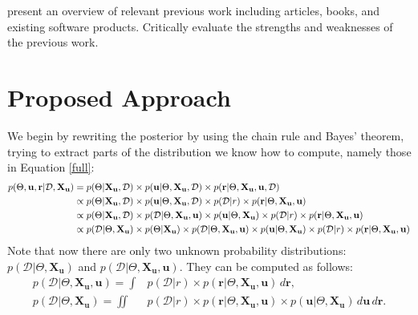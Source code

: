 \documentclass{mprop}
\theoremstyle{definition}
\begin{document}
present an overview of relevant previous work including articles, books, and
existing software products. Critically evaluate the strengths and weaknesses of
the previous work.

\section{Proposed Approach}


We begin by rewriting the posterior by using the chain rule and Bayes' theorem,
trying to extract parts of the distribution we know how to compute, namely those
in Equation \ref{full}:
\[
  \begin{split}
    p(\Theta, \mathbf{u}, \mathbf{r} | \mathcal{D}, \mathbf{X_u}) &= p(\Theta | \mathbf{X_u}, \mathcal{D}) \times p(\mathbf{u} |
    \Theta, \mathbf{X_u}, \mathcal{D}) \times p(\mathbf{r} | \Theta,
    \mathbf{X_u}, \mathbf{u}, \mathcal{D}) \\
    &\propto p(\Theta | \mathbf{X_u}, \mathcal{D}) \times p(\mathbf{u} | \Theta,
    \mathbf{X_u}, \mathcal{D}) \times p(\mathcal{D} | r) \times p(\mathbf{r} |
    \Theta, \mathbf{X_u}, \mathbf{u}) \\
    &\propto p(\Theta | \mathbf{X_u}, \mathcal{D}) \times p(\mathcal{D} |
    \Theta, \mathbf{X_u}, \mathbf{u}) \times p(\mathbf{u} | \Theta,
    \mathbf{X_u}) \times p(\mathcal{D} | r) \times p(\mathbf{r} | \Theta,
    \mathbf{X_u}, \mathbf{u}) \\
    &\propto p(\mathcal{D} | \Theta, \mathbf{X_u}) \times p(\Theta |
    \mathbf{X_u}) \times p(\mathcal{D} | \Theta, \mathbf{X_u}, \mathbf{u})
    \times p(\mathbf{u} | \Theta, \mathbf{X_u}) \times p(\mathcal{D} | r) \times
    p(\mathbf{r} | \Theta, \mathbf{X_u}, \mathbf{u})
  \end{split}
\]
Note that now there are only two unknown probability distributions:
$p(\mathcal{D} | \Theta, \mathbf{X_u})$ and $p(\mathcal{D} | \Theta,
\mathbf{X_u}, \mathbf{u})$. They can be computed as follows:
\begin{align*}
  p(\mathcal{D} | \Theta, \mathbf{X_u}, \mathbf{u}) = \int &p(\mathcal{D} | r) \times p(\mathbf{r} | \Theta, \mathbf{X_u}, \mathbf{u}) \, d\mathbf{r}, \\
  p(\mathcal{D} | \Theta, \mathbf{X_u}) = \iint &p(\mathcal{D} | r) \times p(\mathbf{r} | \Theta, \mathbf{X_u}, \mathbf{u}) \times p(\mathbf{u} | \Theta, \mathbf{X_u}) \, d\mathbf{u} \, d\mathbf{r}.
\end{align*}
\end{document}
